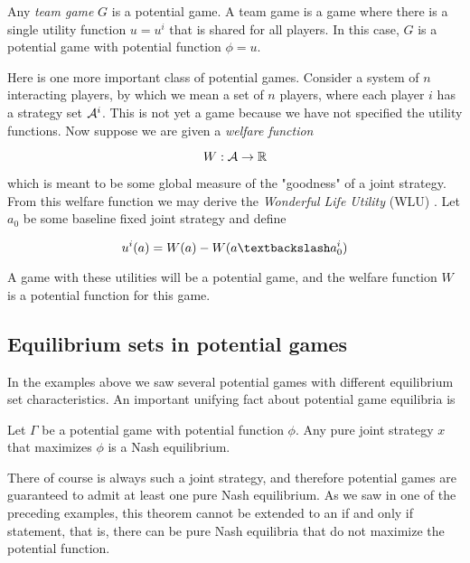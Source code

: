 Any {\em team game} $G$ is a potential game. A team game is a game where there is a single utility function $u = u^i$ that is shared for all players. In this case, $G$ is a potential game with potential function $\phi = u$.

Here is one more important class of potential games. Consider a system of $n$ interacting players, by which we mean a set of $n$ players, where each player $i$ has a strategy set $\AA^i$. This is not yet a game because we have not specified the utility functions. Now suppose we are given a {\em welfare function}

\begin{equation}
    W: \AA \rightarrow \mathbb{R}
\end{equation}

which is meant to be some global measure of the "goodness" of a joint strategy. From this welfare function we may derive the {\em Wonderful Life Utility} (WLU) \cite{wolpert2002optimal}. Let $a_0$ be some baseline fixed joint strategy and define

\begin{equation}
    u^i(a) = W(a) - W(\asub{a}{a_0^i})
\end{equation}

A game with these utilities will be a potential game, and the welfare function $W$ is a potential function for this game.




\subsection{Equilibrium sets in potential games}

In the examples above we saw several potential games with different equilibrium set characteristics. An important unifying fact about potential game equilibria is


\begin{thm}\cite{monderer1996potential}
Let $\Gamma$ be a potential game with potential function $\phi$. Any pure joint strategy $x$ that maximizes $\phi$ is a Nash equilibrium.
\label{thm:potmax}
\end{thm}

There of course is always such a joint strategy, and therefore potential games are guaranteed to admit at least one pure Nash equilibrium. As we saw in one of the preceding examples, this theorem cannot be extended to an if and only if statement, that is, there can be pure Nash equilibria that do not maximize the potential function.


